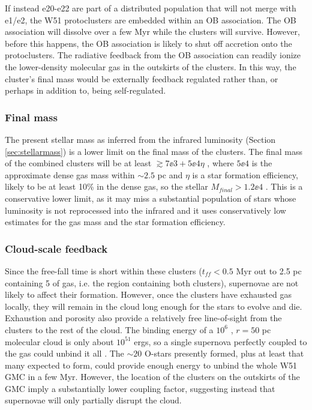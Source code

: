 If instead e20-e22 are part of a distributed population that will not merge
with e1/e2, the W51 protoclusters are embedded within an OB association.  The
OB association will dissolve over a few Myr while the clusters will survive.
However, before this happens, the OB association is likely to shut off
accretion onto the protoclusters.  The radiative feedback from the OB
association can readily ionize the lower-density molecular gas in the outskirts
of the clusters.  In this way, the cluster's final mass would be externally
feedback regulated rather than, or perhaps in addition to, being
self-regulated.



\subsubsection{Final mass}
The present stellar mass as inferred from the infrared luminosity (Section
\ref{sec:stellarmass}) is a lower limit on the final mass of the clusters.  The
final mass of the combined clusters will be at least $\gtrsim7\ee{3} + 5\ee{4} \eta$ \msun,
where $5\ee{4}$ \msun is the approximate dense gas mass within $\sim2.5$ pc and
$\eta$ is a star formation efficiency, likely to be at least 10\% in the dense
gas, so the stellar $M_{final} > 1.2\ee{4}$ \msun.  This is a conservative lower
limit, as it may miss a substantial population of stars whose luminosity is not
reprocessed into the infrared and it uses conservatively low estimates for the 
gas mass and the star formation efficiency.

\subsubsection{Cloud-scale feedback}
Since the free-fall time is short within these clusters ($t_{ff} < 0.5$ Myr out
to 2.5 pc containing 5 \msun of gas, i.e. the region containing both
clusters), supernovae are not likely
to affect their formation.  However, once the clusters have exhausted gas
locally, they
will remain in the cloud long enough for the stars to evolve and die.
Exhaustion and porosity also provide a relatively free line-of-sight from the
clusters to the rest
of the cloud.  The binding energy of a $10^6$ \msun, $r=50$ pc 
molecular cloud is only about $10^{51}$ ergs, so a single supernova perfectly
coupled to the gas could unbind it all \citep[though typical energy delivered
to molecular clouds is lower, $\sim0.01-0.25$; see references in][appendix
B]{Kruijssen2012a}.  The $\sim20$ O-stars presently formed,
plus at least that many expected to form, could provide enough energy
to unbind the whole W51 GMC in a few Myr.  However, the location of the clusters
on the outskirts of the GMC imply a substantially lower coupling factor,
suggesting instead that supernovae will only partially disrupt the cloud.

